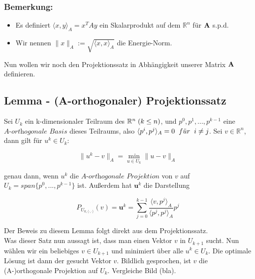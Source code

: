 \subsubsection{Bemerkung:}\label{sss.Bemerkung zu A-orthogonal}

\begin{itemize}
\item Es definiert $\langle x,y \rangle _{A} = x^{T}Ay$ ein Skalarprodukt auf dem $\mathbb{R}^{n}$ für ${\textbf{A}}$ s.p.d.
\item Wir nennen $\|x\|_{A} := \sqrt{\langle x, x \rangle _{A}}$ die Energie-Norm.
\end{itemize}

Nun wollen wir noch den Projektionssatz in Abhängigkeit unserer Matrix ${\textbf{A}}$ definieren.

\subsection{Lemma - (A-orthogonaler) Projektionssatz}\label{s.Projektionssatz}

Sei $U_{k}$ ein k-dimensionaler Teilraum des $\mathbb{R}^{n} \hspace{1mm} (k \le n)$, und $p^{0}, p^{1},...,p^{k-1}$ eine $\textit{A-orthogonale Basis}$ dieses Teilraums, also $\langle p^{i}, p^{j} \rangle _{A} = 0 \hspace{2mm} f\ddot{u}r \hspace{2mm} i \ne j$. Sei $v \in \mathbb{R}^{n}$, dann gilt für $u^{k} \in U_{k}$:

\begin{equation}
\|u^{k} - v\|_{A} = \underset{u \in U_{k}}{\min} \|u - v\|_{A}
\end{equation}

genau dann, wenn $u^{k}$ die $\textit{A-orthogonale Projektion}$ von $v$ auf $U_{k} = span\{p^{0},...,p^{k-1}\}$ ist. Außerdem hat $\textbf{u}^{k}$ die Darstellung

\begin{equation}
P_{U_{k,\langle \cdot,\cdot \rangle}}(v) = \textbf{u}^{k} = \sum_{j=0}^{k-1} \frac {\langle v, p^{j} \rangle _{A}} {\langle p^{j}, p^{j} \rangle _{A}} p^{j}
\end{equation}

Der Beweis zu diesem Lemma folgt direkt aus dem Projektionssatz. \\
Was dieser Satz nun aussagt ist, dass man einen Vektor $v$ in $U_{k+1}$ sucht. Nun wählen wir ein beliebiges $v \in U_{k+1}$ und minimiert über alle $u^{k} \in U_{k}$. Die optimale Lösung ist dann der gesucht Vektor $v$.
Bildlich gesprochen, ist $v$ die (A-)orthogonale Projektion auf $U_{k}$. Vergleiche Bild (bla). \\ \\

